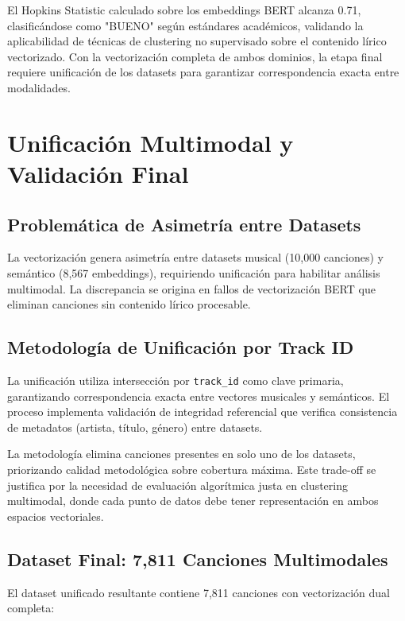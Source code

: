 \documentclass[12pt,a4paper]{report}
\begin{document}
El Hopkins Statistic calculado sobre los embeddings BERT alcanza 0.71, clasificándose como "BUENO" según estándares académicos, validando la aplicabilidad de técnicas de clustering no supervisado sobre el contenido lírico vectorizado. Con la vectorización completa de ambos dominios, la etapa final requiere unificación de los datasets para garantizar correspondencia exacta entre modalidades.

\section{Unificación Multimodal y Validación Final}

\subsection{Problemática de Asimetría entre Datasets}

La vectorización genera asimetría entre datasets musical (10,000 canciones) y semántico (8,567 embeddings), requiriendo unificación para habilitar análisis multimodal. La discrepancia se origina en fallos de vectorización BERT que eliminan canciones sin contenido lírico procesable.

\subsection{Metodología de Unificación por Track ID}

La unificación utiliza intersección por \texttt{track\_id} como clave primaria, garantizando correspondencia exacta entre vectores musicales y semánticos. El proceso implementa validación de integridad referencial que verifica consistencia de metadatos (artista, título, género) entre datasets.

La metodología elimina canciones presentes en solo uno de los datasets, priorizando calidad metodológica sobre cobertura máxima. Este trade-off se justifica por la necesidad de evaluación algorítmica justa en clustering multimodal, donde cada punto de datos debe tener representación en ambos espacios vectoriales.

\subsection{Dataset Final: 7,811 Canciones Multimodales}

El dataset unificado resultante contiene 7,811 canciones con vectorización dual completa:
\end{document}
